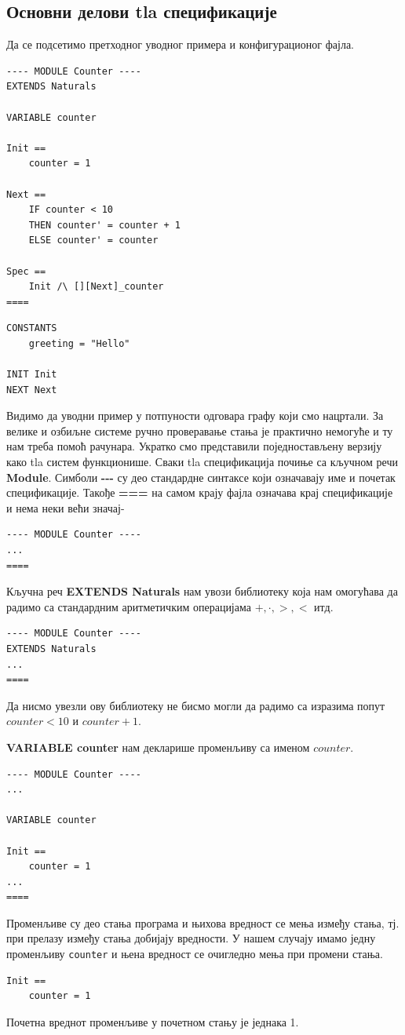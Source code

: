 \subsection{Основни делови tla спецификације}
Да се подсетимо претходног уводног примера и конфигурационог фајла.
\begin{lstlisting}
---- MODULE Counter ----
EXTENDS Naturals

VARIABLE counter

Init ==
    counter = 1

Next ==
    IF counter < 10
    THEN counter' = counter + 1
    ELSE counter' = counter

Spec ==
    Init /\ [][Next]_counter
====
\end{lstlisting}
\begin{lstlisting}
CONSTANTS
    greeting = "Hello"

INIT Init
NEXT Next
\end{lstlisting}
Видимо да уводни пример у потпуности одговара графу који смо нацртали. За велике и озбиљне системе
ручно проверавање стања је практично немогуће и ту нам треба помоћ рачунара. Укратко смо представили
поједностављену верзију како tla систем функционише.
Сваки tla спецификација почиње са кључном речи \textbf{Module}. Симболи \textbf{-\;-\;-}  су део стандардне
синтаксе који означавају име и почетак спецификације. Такође \textbf{=\;=\;=} на самом крају фајла
означава крај спецификације и нема неки већи значај-
\begin{lstlisting}
---- MODULE Counter ----
...
====
\end{lstlisting}

Кључна реч \textbf{EXTENDS Naturals} нам увози библиотеку која нам омогућава да радимо са стандардним аритметичким
операцијама $+, \cdot, >, <$ итд.
\begin{lstlisting}
---- MODULE Counter ----
EXTENDS Naturals
...
====
\end{lstlisting}
Да нисмо увезли ову библиотеку не бисмо могли да радимо са изразима попут $counter < 10$ и $counter + 1$.

\textbf{VARIABLE counter} нам декларише променљиву са именом $counter$.
\begin{lstlisting}
---- MODULE Counter ----
...

VARIABLE counter

Init ==
    counter = 1
...
====
\end{lstlisting}
Променљиве су део стања програма и њихова вредност се мења између стања, тј. при прелазу  између стања
добијају вредности. У нашем случају имамо једну променљиву \texttt{counter} и њена вредност се очигледно
мења при промени стања.
\begin{lstlisting}
Init ==
    counter = 1
\end{lstlisting}
Почетна вреднот променљиве у почетном стању је једнака 1.

